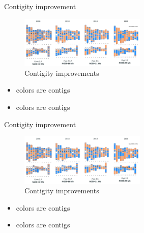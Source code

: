 \documentclass{beamer}
\begin{document}
  \begin{frame}{Contigity improvement}
    \begin{figure}
      \includegraphics[width=6cm]{images/contigity_improvement.png}
      \caption{Contigity improvements}
      \label{fig:contig_improvements}
    \end{figure}
    \begin{itemize}[<+- | alert@+>]
      \item colors are contigs

      \item colors are contigs
    \end{itemize}
  \end{frame}

  \begin{frame}{Contigity improvement}
    \begin{figure}
      \includegraphics[width=6cm]{images/contigity_improvement.png}
      \caption{Contigity improvements}
      \label{fig:contig_improvements}
    \end{figure}
    \begin{itemize}[<+- | alert@+>]
      \item colors are contigs

      \item colors are contigs
    \end{itemize}
  \end{frame}
\end{document}
